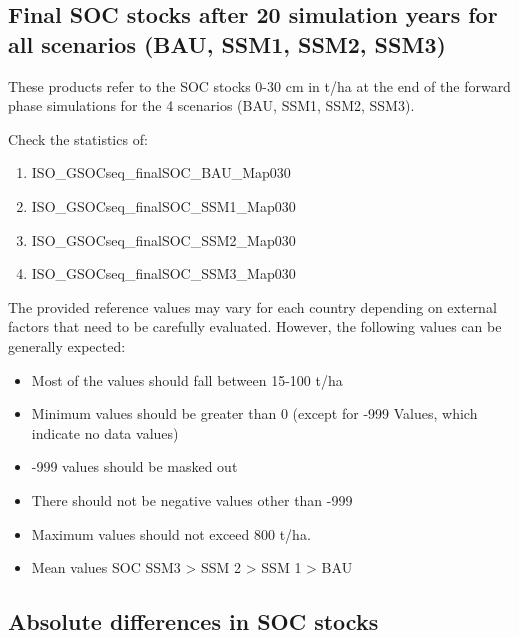\documentclass[
  10pt,
  b5paper,
]{book}
\providecommand{\tightlist}{%
  \setlength{\itemsep}{0pt}\setlength{\parskip}{0pt}}
\begin{document}
\hypertarget{final-soc-stocks-after-20-simulation-years-for-all-scenarios-bau-ssm1-ssm2-ssm3}{%
\subsection*{Final SOC stocks after 20 simulation years for all scenarios (BAU, SSM1, SSM2, SSM3)}\label{final-soc-stocks-after-20-simulation-years-for-all-scenarios-bau-ssm1-ssm2-ssm3}}

These products refer to the SOC stocks 0-30 cm in t/ha at the end of the forward phase simulations for the 4 scenarios (BAU, SSM1, SSM2, SSM3).

Check the statistics of:

\begin{enumerate}
\def\labelenumi{\arabic{enumi}.}
\tightlist
\item
  ISO\_GSOCseq\_finalSOC\_BAU\_Map030
\item
  ISO\_GSOCseq\_finalSOC\_SSM1\_Map030
\item
  ISO\_GSOCseq\_finalSOC\_SSM2\_Map030
\item
  ISO\_GSOCseq\_finalSOC\_SSM3\_Map030
\end{enumerate}

The provided reference values may vary for each country depending on external factors that need to be carefully evaluated. However, the following values can be generally expected:

\begin{itemize}
\tightlist
\item
  Most of the values should fall between 15-100 t/ha
\item
  Minimum values should be greater than 0 (except for -999 Values, which indicate no data values)
\item
  -999 values should be masked out
\item
  There should not be negative values other than -999
\item
  Maximum values should not exceed 800 t/ha.
\item
  Mean values SOC SSM3 \textgreater{} SSM 2 \textgreater{} SSM 1 \textgreater{} BAU
\end{itemize}

\hypertarget{absolute-differences-in-soc-stocks}{%
\subsection*{Absolute differences in SOC stocks}\label{absolute-differences-in-soc-stocks}}
\end{document}
